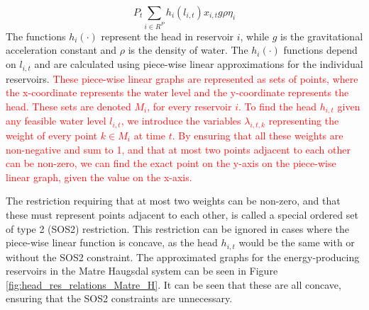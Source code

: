 \begin{equation}
    P_{t}\sum_{i\in R^P} h_{i}(l_{i,t})x_{i,t}g\rho\eta_i
    \label{eq:reward2}
\end{equation}
The functions $h_{i}(\cdot)$ represent the head in reservoir $i$, while $g$ is the gravitational acceleration constant and $\rho$ is the density of water. The $h_{i}(\cdot)$ functions depend on $l_{i,t}$ and are calculated using piece-wise linear approximations for the individual reservoirs. \textcolor{red}{These piece-wise linear graphs are represented as sets of points, where the x-coordinate represents the water level and the y-coordinate represents the head. These sets are denoted $M_i$, for every reservoir $i$.  To find the head $h_{i,t}$ given any feasible water level $l_{i,t}$, we introduce the variables $\lambda_{i,t,k}$ representing the weight of every point $k \in M_i$ at time $t$. By ensuring that all these weights are non-negative and sum to 1, and that at most two points adjacent to each other can be non-zero, we can find the exact point on the y-axis on the piece-wise linear graph, given the value on the x-axis.} 

The restriction requiring that at most two weights can be non-zero, and that these must represent points adjacent to each other, is called a special ordered set of type 2 (SOS2) restriction. This restriction can be ignored in cases where the piece-wise linear function is concave, as the head $h_{i,t}$ would be the same with or without the SOS2 constraint. The approximated graphs for the energy-producing reservoirs in the Matre Haugsdal system can be seen in Figure \ref{fig:head_res_relations_Matre_H}. It can be seen that these are all concave, ensuring that the SOS2 constraints are unnecessary. 


